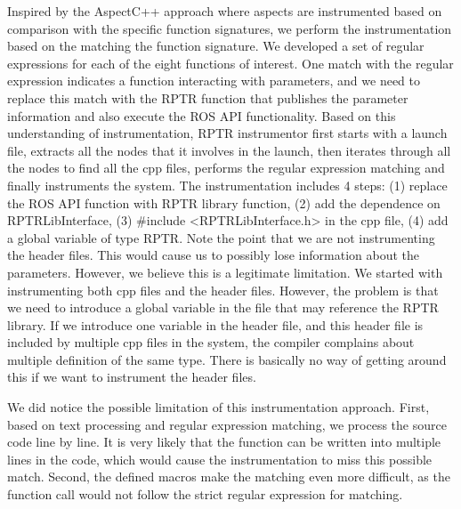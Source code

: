 Inspired by the AspectC++ approach where aspects are instrumented based on comparison with the specific function signatures, we perform the instrumentation based on the matching the function signature. We developed a set of regular expressions for each of the eight functions of interest. One match with the regular expression indicates a function interacting with parameters, and we need to replace this match with the RPTR function that publishes the parameter information and also execute the ROS API functionality. Based on this understanding of instrumentation, RPTR instrumentor first starts with a launch file, extracts all the nodes that it involves in the launch, then iterates through all the nodes to find all the cpp files, performs the regular expression matching and finally instruments the system. The instrumentation includes 4 steps: (1) replace the ROS API function with RPTR library function, (2) add the dependence on RPTRLibInterface, (3) #include <RPTRLibInterface.h> in the cpp file, (4) add a global variable of type RPTR. Note the point that we are not instrumenting the header files. This would cause us to possibly lose information about the parameters. However, we believe this is a legitimate limitation. We started with instrumenting both cpp files and the header files. However, the problem is that we need to introduce a global variable in the file that may reference the RPTR library. If we introduce one variable in the header file, and this header file is included by multiple cpp files in the system, the compiler complains about multiple definition of the same type. There is basically no way of getting around this if we want to instrument the header files. 

We did notice the possible limitation of this instrumentation approach. First, based on text processing and regular expression matching, we process the source code line by line. It is very likely that the function can be written into multiple lines in the code, which would cause the instrumentation to miss this possible match. Second, the defined macros make the matching even more difficult, as the function call would not follow the strict regular expression for matching. 

